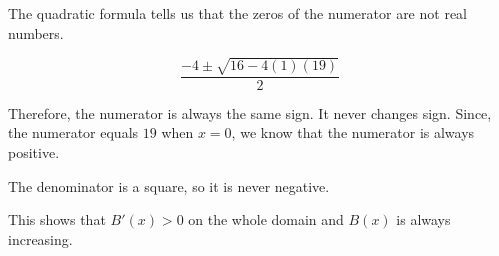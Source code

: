 \documentclass{ximera}
\begin{document}
\begin{exercise}
The quadratic formula tells us that the zeros of the numerator are not real numbers.


\[
\frac{-4 \pm \sqrt{16 - 4 (1) (19)}}{2}
\]


Therefore, the numerator is always the same sign.  It never changes sign.  Since, the numerator equals $19$ when $x=0$, we know that the numerator is always positive.  

The denominator is a square, so it is never negative.


This shows that $B'(x) > 0$ on the whole domain and $B(x)$ is always increasing.




\end{exercise}
\end{document}
